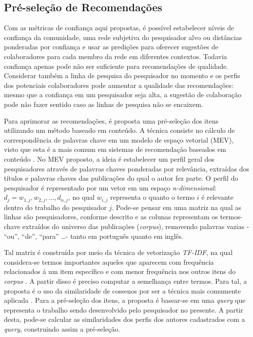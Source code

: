 \documentclass[12pt]{article}
\begin{document}
\subsection{Pré-seleção de Recomendações} \label{sect:pre-selection}

Com as métricas de confiança aqui propostas, é possível estabelecer níveis de confiança da comunidade, uma rede subjetiva do pesquisador alvo ou distâncias ponderadas por confiança e usar as predições para oferecer sugestões de colaboradores para cada membro da rede em diferentes contextos. Todavia confiança apenas pode não ser suficiente para recomendações de qualidade. 
Considerar também a linha de pesquisa do pesquisador no momento e os perfis dos potenciais colaboradores pode aumentar a qualidade das recomendações: mesmo que a confiança em um pesquisador seja alta, a sugestão de colaboração pode não fazer sentido caso as linhas de pesquisa não se encaixem.

Para aprimorar as recomendações, é proposta uma pré-seleção dos itens utilizando um método baseado em conteúdo. A 
técnica consiste no cálculo de correspondência de palavras chave em um modelo de espaço vetorial (MEV), visto que 
esta é a mais comum em sistemas de recomendação baseados em conteúdo \cite{ricci2011introduction}. No MEV proposto, a ideia é estabelecer um 
perfil geral dos pesquisadores através de palavras chaves ponderadas por relevância, extraídas dos títulos e palavras chaves 
das publicações do qual o autor fez parte. O perfil do pesquisador é representado por um vetor em um espaço \textit{n-dimensional}: 
$d_j = {w_{1,j}, w_{2,j}, \dots ,d_{n,j}}$, no qual $w_{i,j}$ representa o quanto o termo $i$ é relevante dentro do trabalho do 
pesquisador $j$. Pode-se pensar em uma matriz na qual as linhas são pesquisadores, conforme descrito e as colunas representam os 
termos-chave extraídos do universo das publicações (\textit{corpus}), removendo palavras vazias - “ou”, “de”, “para” \dots - 
tanto em português quanto em inglês.

Tal matriz é construída por meio da técnica de vetorização \textit{TF-IDF}, na qual considera-se termos importantes aqueles que 
aparecem com frequência relacionados á um item específico e com menor frequência nos outros itens do \textit{corpus} 
\cite{pazzani2007content}. A partir disso é preciso computar a semelhança entre termos. Para tal, a proposta é o uso da 
similaridade de cossenos por ser a técnica mais comumente aplicada \cite{ricci2011introduction}. Para a pré-seleção dos itens, a 
proposta é basear-se em uma \textit{query} que representa o trabalho sendo desenvolvido pelo pesquisador no presente. A partir 
desta, pode-se calcular as similaridades dos perfis dos autores cadastrados com a \textit{query}, construindo assim a pré-seleção.
\end{document}
